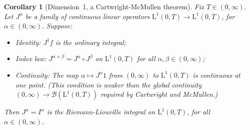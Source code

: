 \documentclass[12pt,reqno]{amsart}
\theoremstyle{plain}
\newtheorem{corollary}[theorem]{Corollary}
\numberwithin{equation}{section} %
\begin{document}
\begin{corollary}[Dimension~1, a Cartwright-McMullen theorem] \label{th_CM}
Fix $T\in (0,\infty)$. Let $J^\alpha$ be a family of continuous linear operators $\mathrm{L}^1(0,T)\rightarrow \mathrm{L}^1(0,T)$, for $\alpha\in (0,\infty)$. Suppose: 
\begin{itemize}
\item Identity: $J^1 f$ is the ordinary integral;
\item Index law: $J^{\alpha+\beta}=J^\alpha\circ J^\beta$ on $\mathrm{L}^1(0,T)$ for all $\alpha,\beta\in (0,\infty)$; 
\item Continuity: The map $\alpha\mapsto J^{\alpha} 1$ from $(0,\infty)$ to $\mathrm{L}^1(0,T)$ is continuous at one point. (This condition is weaker than the global continuity $(0,\infty)\rightarrow\mathcal{B}(\mathrm{L}^1(0,T))$ required by Cartwright and McMullen.)
\end{itemize}
Then $J^\alpha=I^\alpha$ is the Riemann-Liouville integral on $\mathrm{L}^1(0,T)$, for all $\alpha\in (0,\infty)$.
\end{corollary}
\end{document}
